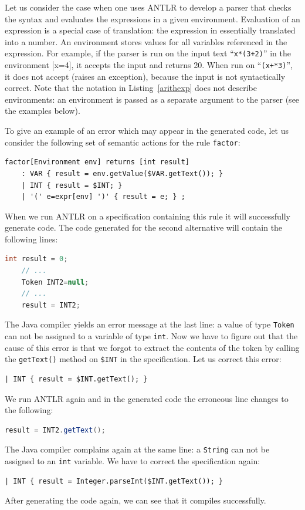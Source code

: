 \documentclass{informat} %
\newcommand{\lstref}[1]{Listing~\ref{#1}}
\newcommand{\tool}[1]{\textsc{#1}}
\begin{document}
Let us consider the case when one uses \tool{ANTLR} to develop a parser that checks the syntax and evaluates the expressions in a given environment. Evaluation of an expression is a special case of translation: the expression in essentially translated into a number. An environment stores values for all variables referenced in the expression. For example, if the parser is run on the input text ``\texttt{x*(3+2)}'' in the environment [x=4], it accepts the input and returns 20. When run on ``\texttt{(x+*3)}'', it does not accept (raises an exception), because the input is not syntactically correct. 
Note that the notation in \lstref{arithexp} does not describe environments: an environment is passed as a separate argument to the parser (see the examples below). 

To give an example of an error which may appear in the generated code, let us consider the following set of semantic actions for the rule \texttt{factor}:
\begin{lstlisting}[language=ANTLR]
factor[Environment env] returns [int result]
	: VAR { result = env.getValue($VAR.getText()); }
	| INT { result = $INT; }
	| '(' e=expr[env] ')' { result = e; } ;
\end{lstlisting}
When we run \tool{ANTLR} on a specification containing this rule it will successfully generate code. The code generated for the second alternative will contain the following lines:
\begin{lstlisting}[language=Java,escapechar={!}]
	int result = 0;
	// ...
	Token INT2=null;
	// ...
	result = INT2;
\end{lstlisting}
The Java compiler yields an error message at the last line: a value of type \texttt{Token} can not be assigned to a variable of type \texttt{int}. Now we have to figure out that the cause of this error is that we forgot to extract the contents of the token by calling the \texttt{getText()} method on \texttt{\$INT} in the specification. Let us correct this error:
\begin{lstlisting}[language=ANTLR]
	| INT { result = $INT.getText(); }
\end{lstlisting}
We run \tool{ANTLR} again and in the generated code the erroneous line changes to the following:
\begin{lstlisting}[language=Java]
	result = INT2.getText();
\end{lstlisting}
The Java compiler complains again at the same line: a \texttt{String} can not be assigned to an \texttt{int} variable. We have to correct the specification again:
\begin{lstlisting}[language=ANTLR]
	| INT { result = Integer.parseInt($INT.getText()); }
\end{lstlisting}
After generating the code again, we can see that it compiles successfully. 
\end{document}
